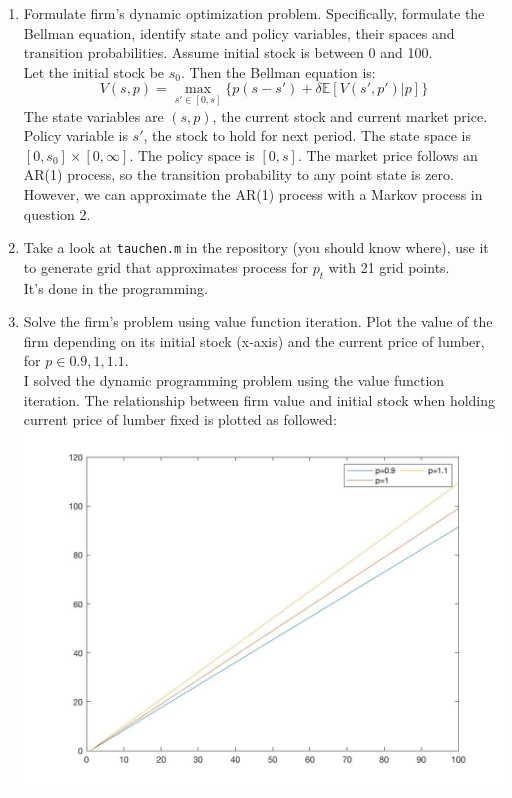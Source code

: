 \documentclass[11pt]{article}
\begin{document}
\begin{enumerate}
\item Formulate firm's dynamic optimization problem. Specifically, formulate the Bellman equation, identify state and policy variables, their spaces and transition probabilities. Assume initial stock is between 0 and 100.\\[2em]
Let the initial stock be $s_0$. Then the Bellman equation is:
$$ 
V(s,p)= \max_{s' \in [0,s]} \{p(s-s')+\delta  \mathbb{E}[V(s', p')|p]\}
$$
The state variables are $(s,p)$, the current stock and current market price. Policy variable is $s'$, the stock to hold for next period. The state space is $[0,s_0]\times [0, \infty]$. The policy space is $[0,s]$. The market price follows an AR(1) process, so the transition probability to any point state is zero. However, we can approximate the AR(1) process with a Markov process in question 2. 


\item Take a look at {\tt tauchen.m} in the repository (you should know where), use it to generate grid that approximates process for $p_t$ with 21 grid points. \\[2em]

It's done in the programming.

\item Solve the firm's problem using value function iteration. Plot the value of the firm depending on its initial stock (x-axis) and the current price of lumber, for $p \in{0.9, 1, 1.1}$.\\[2em]

I solved the dynamic programming problem using the value function iteration. The relationship between firm value and initial stock when holding current price of lumber fixed is plotted as followed: \\
    \includegraphics[scale=0.2]{Vs0.jpg}



\end{enumerate}
\end{document}
